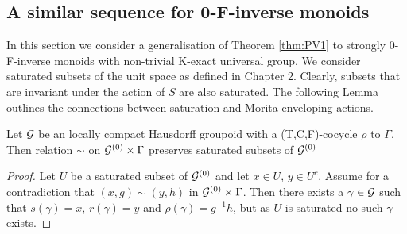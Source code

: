 \begin{corollary}
\section{A similar sequence for 0-F-inverse monoids}\label{sect:S2}
In this section we consider a generalisation of Theorem \ref{thm:PV1} to strongly 0-F-inverse monoids with non-trivial K-exact universal group. We consider saturated subsets of the unit space as defined in Chapter 2. Clearly, subsets that are invariant under the action of $S$ are also saturated. The following Lemma outlines the connections between saturation and Morita enveloping actions.

\begin{lemma}\label{Lem:Cut}
Let $\mathcal{G}$ be an \etale locally compact Hausdorff groupoid with a (T,C,F)-cocycle $\rho$ to $\Gamma$. Then relation $\sim$ on $\mathcal{G}^{(0)} \times \Gamma$ preserves saturated subsets of $\mathcal{G}^{(0)}$
\end{lemma}
\begin{proof}
Let $U$ be a saturated subset of $\mathcal{G}^{(0)}$ and let $x \in U$, $y \in U^{c}$. Assume for a contradiction that $(x,g) \sim (y,h)$ in $\mathcal{G}^{(0)} \times \Gamma$. Then there exists a $\gamma$ $\in \mathcal{G}$ such that $s(\gamma)=x$, $r(\gamma)=y$ and $\rho(\gamma)=g^{-1}h$, but as $U$ is saturated no such $\gamma$ exists. 
\end{proof}


\end{corollary}
